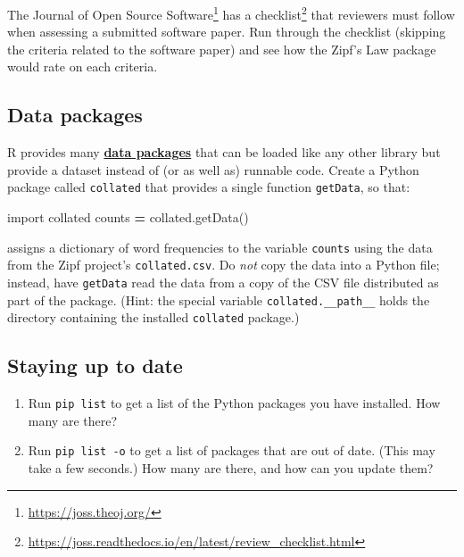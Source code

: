 \documentclass[
]{krantz}
\makeatletter
\newenvironment{Shaded}{\begin{snugshade}}{\end{snugshade}}
\newcommand{\ImportTok}[1]{#1}
\newcommand{\NormalTok}[1]{#1}
\newcommand{\OperatorTok}[1]{\textcolor[rgb]{0.81,0.36,0.00}{\textbf{#1}}}
\renewcommand{\href}[2]{#2\footnote{\url{#1}}}
\newenvironment{kframe}{%
\medskip{}
\setlength{\fboxsep}{.8em}
 \def\at@end@of@kframe{}%
 \ifinner\ifhmode%
  \def\at@end@of@kframe{\end{minipage}}%
  \begin{minipage}{\columnwidth}%
 \fi\fi%
 \def\FrameCommand##1{\hskip\@totalleftmargin \hskip-\fboxsep
 \colorbox{shadecolor}{##1}\hskip-\fboxsep
     \hskip-\linewidth \hskip-\@totalleftmargin \hskip\columnwidth}%
 \MakeFramed {\advance\hsize-\width
   \@totalleftmargin\z@ \linewidth\hsize
   \@setminipage}}%
 {\par\unskip\endMakeFramed%
 \at@end@of@kframe}
\renewenvironment{Shaded}{\begin{kframe}}{\end{kframe}}
\newcommand{\gref}[2]{\hyperlink{#2}{\textbf{#1}}}
\makeatother
\begin{document}
The \href{https://joss.theoj.org/}{Journal of Open Source Software} has a \href{https://joss.readthedocs.io/en/latest/review_checklist.html}{checklist}
that reviewers must follow when assessing a submitted software paper.
Run through the checklist (skipping the criteria related to the software paper)
and see how the Zipf's Law package would rate on each criteria.

\hypertarget{packaging-ex-data}{%
\subsection{Data packages}\label{packaging-ex-data}}

R provides many \gref{data packages}{data\_package}
that can be loaded like any other library but provide a dataset instead of
(or as well as)
runnable code.
Create a Python package called \texttt{collated} that provides a single function \texttt{getData},
so that:

\begin{Shaded}
\begin{Highlighting}[]
\ImportTok{import}\NormalTok{ collated}
\NormalTok{counts }\OperatorTok{=}\NormalTok{ collated.getData()}
\end{Highlighting}
\end{Shaded}

assigns a dictionary of word frequencies to the variable \texttt{counts}
using the data from the Zipf project's \texttt{collated.csv}.
Do \emph{not} copy the data into a Python file;
instead,
have \texttt{getData} read the data from a copy of the CSV file distributed as part of the package.
(Hint: the special variable \texttt{collated.\_\_path\_\_}
holds the directory containing the installed \texttt{collated} package.)

\hypertarget{packaging-ex-up-to-date}{%
\subsection{Staying up to date}\label{packaging-ex-up-to-date}}

\begin{enumerate}
\def\labelenumi{\arabic{enumi}.}
\item
  Run \texttt{pip\ list} to get a list of the Python packages you have installed.
  How many are there?
\item
  Run \texttt{pip\ list\ -o} to get a list of packages that are out of date.
  (This may take a few seconds.)
  How many are there,
  and how can you update them?
\end{enumerate}
\end{document}
